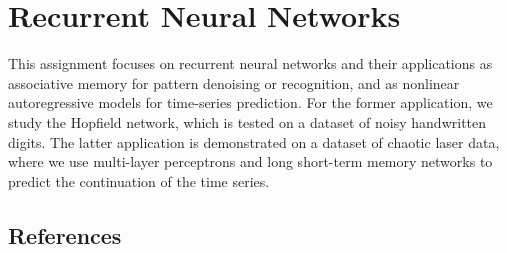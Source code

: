 \documentclass[oneside,a4paper,11pt,explicit]{book}
\title{\ANNtitle}
\subtitle{\ANNsubtitle{#1}}
\author{\ANNprof}
\date{\ANNyear{}}
\newcommand{\ANNtopic}[1]{%
	\maketitle%
	\chapter{#1}%
}
\begin{document}
\ANNtopic{Recurrent Neural Networks}


This assignment focuses on recurrent neural networks and their applications as associative memory for pattern denoising or recognition, and as nonlinear autoregressive models for time-series prediction. 
For the former application, we study the Hopfield network, which is tested on a dataset of noisy handwritten digits.
The latter application is demonstrated on a dataset of chaotic laser data, where we use multi-layer perceptrons and long short-term memory networks to predict the continuation of the time series.





\section*{References}
\printbibliography[heading=none]
\end{document}
